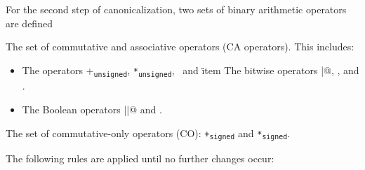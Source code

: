 For the second step of canonicalization, two sets of binary arithmetic
operators are defined

\begin{compactitem}
\item
  The set of commutative and associative operators (CA operators).
  This includes:

  \begin{itemize}
  \item
    The operators +\texttt{\textsubscript{unsigned}},
    \texttt{*\textsubscript{unsigned}}, \plusovf\,
    and \mulovf\.
  item
    The bitwise operators \lstinline@|@, \code{&}, and
    \code{^}.
  \item
    The Boolean operators \lstinline@||@ and \code{&&}.
  \end{itemize}
\item
  The set of commutative-only operators (CO):
  \texttt{+\textsubscript{signed}} and \texttt{*\textsubscript{signed}}.
\end{compactitem}

The following rules are applied until no further changes occur:

